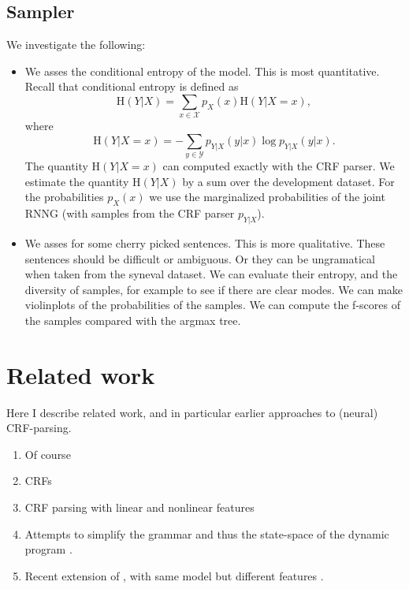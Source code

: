 \subsection{Sampler} We investigate the following:
\begin{itemize}
  \item We asses the conditional entropy of the model. This is most quantitative. Recall that conditional entropy is defined as
  \begin{equation}
    \text{H}(Y|X) = \sum_{x \in \mathcal{X}} p_X(x)\text{H}(Y|X = x),
  \end{equation}
  where
  \begin{equation}
    \text{H}(Y|X = x) = - \sum_{y \in \mathcal{Y}} p_{Y|X}(y|x) \log p_{Y|X}(y|x).
  \end{equation}
  The quantity $\text{H}(Y|X = x)$ can computed exactly with the CRF parser. We estimate the quantity $\text{H}(Y|X)$ by a sum over the development dataset. For the probabilities $p_X(x)$ we use the marginalized probabilities of the joint RNNG (with samples from the CRF parser $p_{Y|X}$).
  \item We asses for some cherry picked sentences. This is more qualitative. These sentences should be difficult or ambiguous. Or they can be ungramatical when taken from the syneval dataset. We can evaluate their entropy, and the diversity of samples, for example to see if there are clear modes. We can make violinplots of the probabilities of the samples. We can compute the f-scores of the samples compared with the argmax tree.
\end{itemize}

\section{Related work}
Here I describe related work, and in particular earlier approaches to (neural) CRF-parsing.
\begin{enumerate}
  \item Of course \citep{stern2017minimal}
  \item CRFs \citep{sutton2012crf}
  \item CRF parsing with linear and nonlinear features \citep{finkel2008crf,klein2015crf}
  \item Attempts to simplify the grammar and thus the state-space of the dynamic program \citep{hall2014less}.
  \item Recent extension of \citet{stern2017minimal}, with same model but different features \citep{kitaev2018attentive}.
\end{enumerate}


